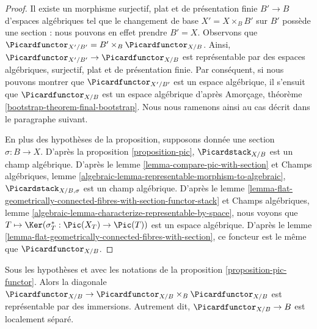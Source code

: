 \begin{proof}
Il existe un morphisme surjectif, plat et de présentation finie
$B' \to B$ d'espaces algébriques tel que le changement de base
$X' = X \times_B B'$ sur $B'$ possède une section : nous pouvons en effet
prendre $B' = X$.
Observons que $\Picardfunctor_{X'/B'} = B' \times_B \Picardfunctor_{X/B}$.
Ainsi, $\Picardfunctor_{X'/B'} \to \Picardfunctor_{X/B}$ est représentable
par des espaces algébriques, surjectif, plat et de présentation finie.
Par conséquent, si nous pouvons montrer que $\Picardfunctor_{X'/B'}$ est un
espace algébrique, il s'ensuit que $\Picardfunctor_{X/B}$ est un espace
algébrique d'après Amorçage, théorème
\ref{bootstrap-theorem-final-bootstrap}.
Nous nous ramenons ainsi au cas décrit dans le paragraphe suivant.

\medskip\noindent
En plus des hypothèses de la proposition, supposons donnée une section
$\sigma : B \to X$. D'après la proposition \ref{proposition-pic},
$\Picardstack_{X/B}$ est un champ algébrique.
D'après le lemme \ref{lemma-compare-pic-with-section} et
Champs algébriques, lemme
\ref{algebraic-lemma-representable-morphism-to-algebraic},
$\Picardstack_{X/B, \sigma}$ est un champ algébrique.
D'après le lemme
\ref{lemma-flat-geometrically-connected-fibres-with-section-functor-stack}
et Champs algébriques, lemme
\ref{algebraic-lemma-characterize-representable-by-space},
nous voyons que $T \mapsto \Ker(\sigma_T^* : \Pic(X_T) \to \Pic(T))$
est un espace algébrique.
D'après le lemme \ref{lemma-flat-geometrically-connected-fibres-with-section},
ce foncteur est le même que $\Picardfunctor_{X/B}$.
\end{proof}

\begin{lemma}
\label{lemma-diagonal-pic}
Sous les hypothèses et avec les notations de la proposition
\ref{proposition-pic-functor}.
Alors la diagonale
$\Picardfunctor_{X/B} \to \Picardfunctor_{X/B} \times_B \Picardfunctor_{X/B}$
est représentable par des immersions. Autrement dit,
$\Picardfunctor_{X/B} \to B$ est localement séparé.
\end{lemma}

